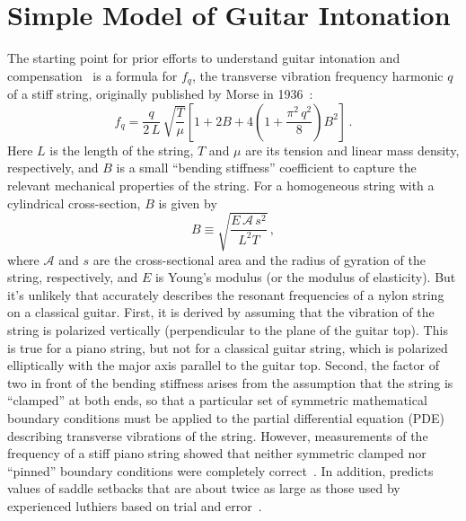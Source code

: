 %
%
%

 \section{Simple Model of Guitar Intonation\label{sct:model}}
The starting point for prior efforts to understand guitar intonation and compensation~\cite{ref:byers1996cgi,ref:varieschi2010icf} is a formula for $f_{q}$, the transverse vibration frequency harmonic $q$ of a stiff string, originally published by Morse in 1936~\cite{ref:morse1981vsb,ref:fletcher1964nvf, ref:fletcher2005pmb}:
 \begin{equation}\label{eqn:f_m_clamped}
f_{q} = \frac{q}{2\, L}\, \sqrt{\frac{T}{\mu}} \left[ 1 + 2 B + 4 \left(1 + \frac{\pi^2\, q^2}{8}\right) B^2 \right]\, .
 \end{equation}
Here $L$ is the length of the string, $T$ and $\mu$ are its tension and linear mass density, respectively, and $B$ is a small ``bending stiffness'' coefficient to capture the relevant mechanical properties of the string. For a homogeneous string with a cylindrical cross-section, $B$ is given by
 \begin{equation} \label{eqn:b_def}
  B \equiv \sqrt{\frac{E\, \mathcal{A}\, s^2}{L^2 T}}\, ,
 \end{equation}
where $\mathcal{A}$ and $s$ are the cross-sectional area and the radius of gyration of the string, respectively, and $E$ is Young's modulus (or the modulus of elasticity). But it's unlikely that  accurately describes the resonant frequencies of a nylon string on a classical guitar. First, it is derived by assuming that the vibration of the string is polarized vertically (perpendicular to the plane of the guitar top). This is true for a piano string, but not for a classical guitar string, which is polarized elliptically with the major axis parallel to the guitar top. Second, the factor of two in front of the bending stiffness arises from the assumption that the string is ``clamped'' at both ends, so that a particular set of symmetric mathematical boundary conditions must be applied to the partial differential equation (PDE) describing transverse vibrations of the string. However, measurements of the frequency of a stiff piano string showed that neither symmetric clamped nor ``pinned'' boundary conditions were completely correct~\cite{ref:fletcher1964nvf}. In addition,  predicts values of saddle setbacks that are about twice as large as those used by experienced luthiers based on trial and error~\cite{ref:buckland2021ror}.

